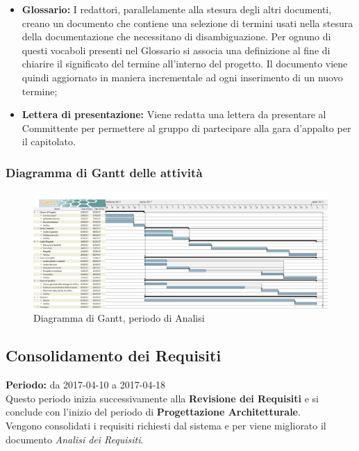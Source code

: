 \begin{itemize}
		\item \textbf{Glossario:} I redattori, parallelamente alla stesura degli altri documenti, creano un documento che contiene una selezione di termini usati nella stesura della documentazione che necessitano di disambiguazione. Per ognuno di questi vocaboli presenti nel Glossario si associa una definizione al fine di chiarire il significato del termine all'interno del progetto. Il documento viene quindi aggiornato in maniera incrementale ad ogni inserimento di un nuovo termine;
		\item \textbf{Lettera di presentazione:} Viene redatta una lettera da presentare al Committente per permettere al gruppo di partecipare alla gara d'appalto per il capitolato. \\
	\end{itemize}
	\subsubsection{Diagramma di Gantt delle attività}
	\begin{figure}[H]
		\centering
		\includegraphics[width=1\linewidth]{immagini/gantt/analisi.png}
		\caption{Diagramma di Gantt, periodo di Analisi}
	\end{figure}
	\subsection{Consolidamento dei Requisiti}
	\textbf{Periodo:} da 2017-04-10 a 2017-04-18 \\
	Questo periodo inizia successivamente alla \textbf{Revisione dei Requisiti} e si conclude con l'inizio del periodo di \textbf{Progettazione Architetturale}. \\
	Vengono consolidati i requisiti richiesti dal sistema e per viene migliorato il documento \textit{Analisi dei Requisiti}. \\
